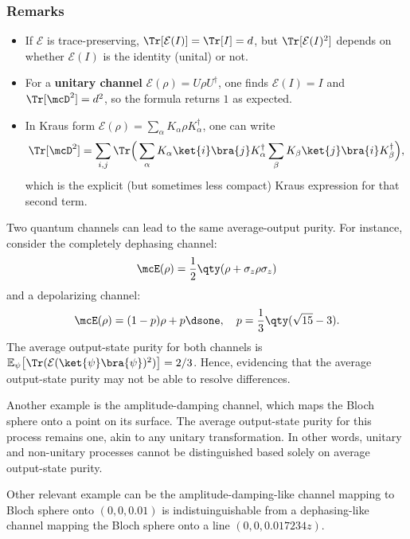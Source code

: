\subsubsection*{Remarks}
\begin{itemize}
\item If $\mathcal{E}$ is trace-preserving, $\Tr[\mathcal{E}(I)] = \Tr[I] = d$,
  but $\Tr[\mathcal{E}(I)^2]$ depends on whether $\mathcal{E}(I)$ is the
  identity (unital) or not.
\item For a \textbf{unitary channel} $\mathcal{E}(\rho) = U \rho U^\dagger$,
  one finds $\mathcal{E}(I) = I$ and $\Tr[\mcD^2] = d^2$, so the
  formula returns $1$ as expected.
\item In Kraus form $\mathcal{E}(\rho) = \sum_\alpha K_\alpha \rho K_\alpha^\dagger$,
  one can write
\begin{equation}
\Tr[\mcD^2] = \sum_{i,j} \Tr \Big(
\sum_\alpha K_\alpha \ket{i}\bra{j} K_\alpha^\dagger
\sum_\beta K_\beta \ket{j}\bra{i} K_\beta^\dagger \Big),
\end{equation}
which is the explicit (but sometimes less compact) Kraus expression for that
second term.
\end{itemize}

Two quantum channels can lead to the same average-output purity. For instance,
consider the completely dephasing channel:
\begin{equation}
\mcE(\rho) = \frac{1}{2}\qty(\rho + \sigma_z \rho \sigma_z)
\end{equation}
and a depolarizing channel:
\begin{equation}
\mcE(\rho) = (1 - p) \rho + p \dsone,\quad p = \frac{1}{3}\qty(\sqrt{15} - 3).
\end{equation}
The average output-state purity for both channels is 
$\mathbb{E}_\psi \big[ \Tr(\mathcal{E}(\ket{\psi}\bra{\psi})^2) \big] = 2/3$.
Hence, evidencing that the average output-state purity may not be able to 
resolve differences.

Another example is the amplitude-damping channel, which maps the Bloch sphere 
onto a point on its surface. The average output-state purity for this process 
remains one, akin to any unitary transformation. In other words, unitary and 
non-unitary processes cannot be distinguished based solely on average 
output-state purity.


Other relevant example can be the amplitude-damping-like channel mapping 
to Bloch sphere onto $(0,0,0.01)$ is indistuinguishable from a dephasing-like
channel mapping the Bloch sphere onto a line $(0,0,0.017234z)$.

\clearpage
